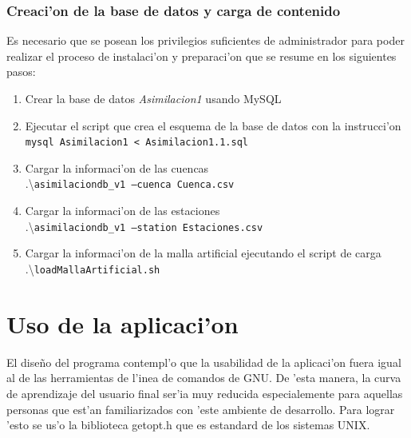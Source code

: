\subsubsection*{Creaci'on de la base de datos y carga de contenido}
Es necesario que se posean los privilegios suficientes de administrador para poder realizar el 
proceso de instalaci'on y preparaci'on que se resume en los siguientes pasos:

\begin{enumerate}
 \item Crear la base de datos \textit{Asimilacion1} usando MySQL
  \item Ejecutar el script que crea el esquema de la base de datos con la instrucci'on \\ \texttt{mysql Asimilacion1 < Asimilacion1.1.sql}
  \item Cargar la informaci'on de las cuencas \\ .\textbackslash\texttt{asimilaciondb\_v1 --cuenca Cuenca.csv}
  \item Cargar la informaci'on de las estaciones \\ .\textbackslash\texttt{asimilaciondb\_v1  --station Estaciones.csv }
  \item Cargar la informaci'on de la malla artificial ejecutando el script de carga \\ .\textbackslash\texttt{loadMallaArtificial.sh}
\end{enumerate}


\section{Uso de la aplicaci'on}

El dise\~no del programa contempl'o que la usabilidad de la aplicaci'on fuera igual al de las herramientas de l'inea de comandos de GNU.
De 'esta manera, la curva de aprendizaje del usuario final ser'ia muy reducida especialemente para aquellas personas que est'an 
familiarizados con 'este ambiente de desarrollo. Para lograr 'esto se us'o la biblioteca getopt.h que es estandard de los sistemas UNIX.


